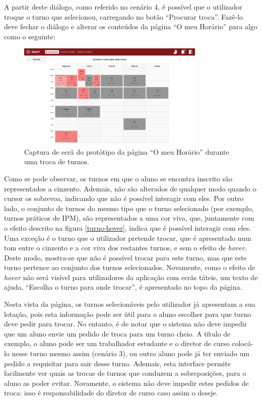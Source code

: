 \documentclass[12pt, a4paper]{article}
\begin{document}
A partir deste diálogo, como referido no cenário 4, é possível que o utilizador troque o turno que
selecionou, carregando no botão ``Procurar troca''. Fazê-lo deve fechar o diálogo e alterar os
conteúdos da página ``O meu Horário'' para algo como o seguinte:

\begin{figure}[H]
    \centering
    \includegraphics[width=0.8\textwidth]{res/prototype/o-meu-horario-trocar.png}
    \caption{Captura de ecrã do protótipo da página ``O meu Horário'' durante uma troca de turnos.}
    \label{o-meu-horario-trocar}
\end{figure}

Como se pode observar, os turnos em que o aluno se encontra inscrito são representados a cinzento.
Ademais, não são alterados de qualquer modo quando o cursor os sobrevoa, indicando que não é
possível interagir com eles. Por outro lado, o conjunto de turnos do mesmo tipo que o turno
selecionado (por exemplo, turnos práticos de IPM), são representados a uma cor viva, que,
juntamente com o efeito descrito na figura \ref{turno-hover}, indica que é possível interagir com
eles. Uma exceção é o turno que o utilizador pretende trocar, que é apresentado num tom entre o
cinzento e a cor viva dos restantes turnos, e sem o efeito de \emph{hover}. Deste modo, mostra-se
que não é possível trocar para este turno, mas que este turno pertence ao conjunto dos turnos
selecionados. Novamente, como o efeito de \emph{hover} não será visível para utilizadores da
aplicação com ecrãs táteis, um texto de ajuda, ``Escolha o turno para onde trocar'', é apresentado
no topo da página.

Nesta vista da página, os turnos selecionáveis pelo utilizador já apresentam a sua lotação, pois
esta informação pode ser útil para o aluno escolher para que turno deve pedir para trocar. No
entanto, é de notar que o sistema não deve impedir que um aluno envie um pedido de troca para um
turno cheio. A título de exemplo, o aluno pode ser um trabalhador estudante e o diretor de curso
colocá-lo nesse turno mesmo assim (cenário 3), ou outro aluno pode já ter enviado um pedido a
requisitar para sair desse turno. Ademais, esta interface permite facilmente ver quais as trocas de
turnos que conduzem a sobreposições, para o aluno as poder evitar. Novamente, o sistema não deve
impedir estes pedidos de troca: isso é responsabilidade do diretor de curso caso assim o deseje.
\end{document}

